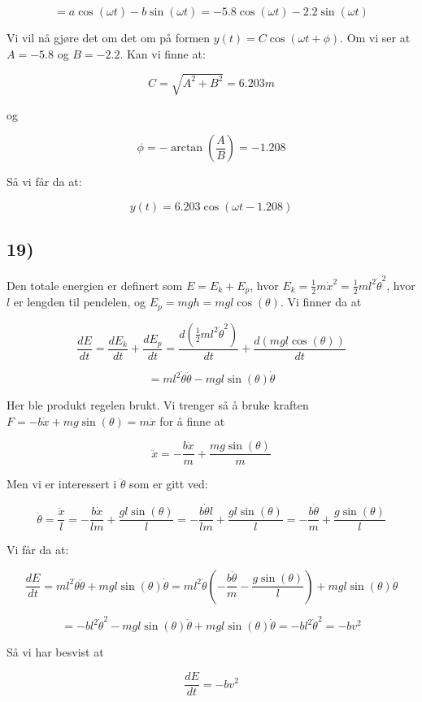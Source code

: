 \documentclass[a4paper,norsk, 10pt]{article}
\begin{document}
$$
= a\cos(\omega t) - b\sin(\omega t) = -5.8\cos(\omega t) - 2.2\sin(\omega t)
$$

Vi vil nå gjøre det om det om på formen $y(t) = C\cos(\omega t + \phi)$. Om vi ser at $A = -5.8$ og $B = -2.2$. Kan vi finne at:

$$
C = \sqrt{A^2 + B^2} = 6.203 m
$$

og

$$
\phi = -\arctan(\frac{A}{B}) = -1.208
$$


Så vi får da at:

$$
y(t) = 6.203\cos(\omega t - 1.208)
$$

\subsection*{19)}

Den totale energien er definert som $E = E_k + E_p$, hvor $E_k = \frac{1}{2}m\dot{x}^2 = \frac{1}{2}ml^2\dot{\theta}^2$, hvor $l$ er lengden til pendelen, og $E_p = mgh = mgl\cos(\theta)$. Vi finner da at

$$
\frac{dE}{dt} = \frac{dE_k}{dt} + \frac{dE_p}{dt} = \frac{d(\frac{1}{2}ml^2\dot{\theta}^2)}{dt} + \frac{d(mgl\cos(\theta))}{dt}
$$

$$
= ml^2\dot{\theta}\ddot{\theta} - mgl\sin(\theta)\dot{\theta}
$$

Her ble produkt regelen brukt. Vi trenger så å bruke kraften $F = -b\dot{x} +mg\sin(\theta) = m\ddot{x}$ for å finne at

$$
\ddot{x} = -\frac{b\dot{x}}{m} + \frac{mg\sin(\theta)}{m}
$$

Men vi er interessert i $\ddot{\theta}$ som er gitt ved:

$$
\ddot{\theta} = \frac{\ddot{x}}{l} = -\frac{b\dot{x}}{lm} + \frac{gl\sin(\theta)}{l} = -\frac{b\dot{\theta}l}{lm} + \frac{gl\sin(\theta)}{l} =- \frac{b\dot{\theta}}{m} + \frac{g\sin(\theta)}{l}
$$

Vi får da at:

$$
\frac{dE}{dt} = ml^2\dot{\theta}\ddot{\theta} + mgl\sin(\theta)\dot{\theta} = ml^2\dot{\theta}(- \frac{b\dot{\theta}}{m} - \frac{g\sin(\theta)}{l}) + mgl\sin(\theta)\dot{\theta}
$$

$$
= -bl^2\dot{\theta}^2 - mgl\sin(\theta)\dot{\theta} + mgl\sin(\theta)\dot{\theta} = -bl^2\dot{\theta}^2 = -bv^2
$$

Så vi har besvist at 

$$
\frac{dE}{dt} = -bv^2
$$
\end{document}
